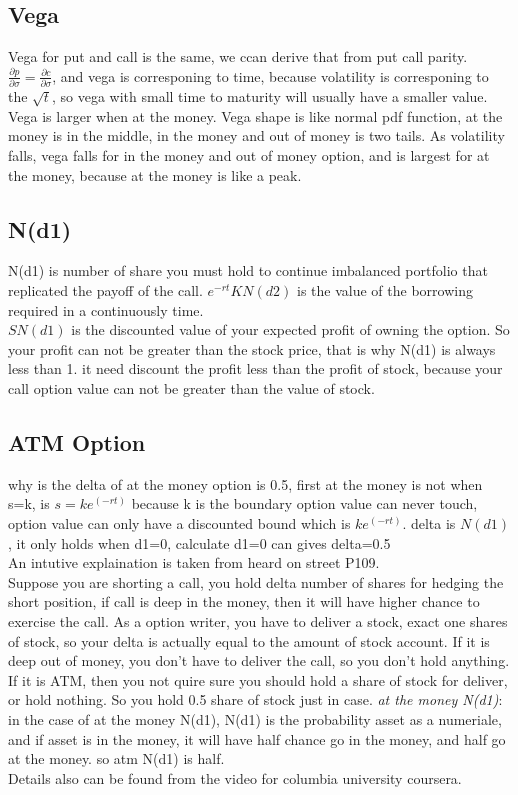 \documentclass[a4paper,11pt]{article}
\begin{document}
\subsection{Vega}
Vega for put and call is the same, we ccan derive that from put call parity. $\frac{\partial p}{\partial \sigma}=\frac{\partial c}{\partial \sigma}$, and vega is corresponing to time, because volatility is corresponing to the $\sqrt{t}$, so vega with small time to maturity will usually have a smaller value. Vega is larger when at the money. Vega shape is like normal pdf function, at the money is in the middle, in the money and out of money is two tails. As volatility falls, vega falls for in the money and out of money option, and is largest for at the money, because at the money is like a peak.\\



\subsection{N(d1)}
N(d1) is number of share you must hold to continue imbalanced portfolio that replicated the payoff of the call.
$e^{-rt}KN(d2)$ is the value of the borrowing required in a continuously time.\\
 $SN(d1)$ is the discounted value of your expected profit of owning the option. So your profit can not be greater than the stock price, that is why N(d1) is always less than 1. it need discount the profit less than the profit of stock, because your call option value can not be greater than the value of stock.

\subsection{ATM Option}
why is the delta of at the money option is 0.5, first at the money is not when s=k, is $s=ke^{(-rt)}$ because k is the boundary option value can never touch, option value can only have a discounted bound which is $ke^{(-rt)}$. delta is $N(d1)$, it only holds when d1=0, calculate d1=0 can gives delta=0.5\\
An intutive explaination is taken from heard on street P109.\\
Suppose you are shorting a call, you hold delta number of shares for hedging the short position, if call is deep in the money, then it will have higher chance to exercise the call. As a option writer, you have to deliver a stock, exact one shares of stock, so your delta is actually equal to the amount of stock account. If it is deep out of money, you don't have to deliver the call, so you don't hold anything. If it is ATM, then you not quire sure you should hold a share of stock for deliver, or hold nothing. So you hold 0.5 share of stock just in case.
{\em  at the money N(d1)}: in the case of at the money N(d1), N(d1) is the probability asset as a numeriale, and if asset is in the money, it will have half chance go in the money, and half go at the money. so atm N(d1) is half.\\ Details also can be found from the video for columbia university coursera.\\
\end{document}
